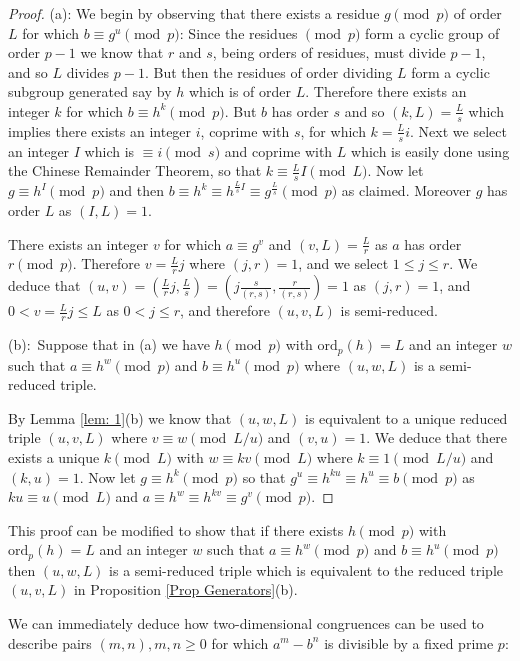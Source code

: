 \documentclass[12pt, a4paper,  reqno, english]{amsart}%
\numberwithin{equation}{section}
\theoremstyle{definition}
\renewcommand{\leq}{\leqslant}
\begin{document}
\begin{proof}  (a):  We begin by observing that there exists a residue $g \pmod p$ of order $L$ for which $b\equiv g^u\pmod p$:   Since the residues $\pmod p$ form a cyclic group of order $p-1$ we know that $r$ and $s$, being orders of residues, must divide $p-1$, and so $L$ divides $p-1$.
But then the residues of order dividing $L$ form a cyclic subgroup generated say by $h$ which is of order $L$. Therefore   there exists an integer $k$ for which $b\equiv h^k \pmod p$.  But $b$ has order $s$ and so 
$(k,L)=\frac{L}s$ which implies there exists an integer $i$, coprime with $s$, for which $k=\frac{L}s i$.  Next we select an integer $I$ which is $\equiv i \pmod s$ and coprime with $L$ which is easily done using the Chinese Remainder Theorem, so that
$k\equiv \frac{L}s I \pmod {L}$. Now let $g\equiv h^I \pmod p$ and then 
$b\equiv h^k \equiv h^{ \frac{L}s I}\equiv g^{\frac{L}s} \pmod p$ as claimed. Moreover $g$ has order $L$ as $(I,L)=1$.

There exists an integer $v$ for which $a\equiv g^v$ and $(v,L)=\frac{L}r$ as $a$ has order $r \pmod p$. Therefore $v=\frac{L}r j$ where $(j,r)=1$, and we select $1\leq j\leq r$.  We deduce that $(u,v)=(\frac{L}rj, \frac{L}s) =( j\frac s{(r,s)},\frac r{(r,s)}) =1  $ as $(j,r)=1$,
and   $0<v= \frac{L}r j\leq L$ as $0<j\leq r$, and therefore  $(u,v,L)$ is semi-reduced.

(b):\ Suppose that in (a) we have  $h\pmod p$ with $\text{ord}_p(h)=L$ and an integer $w$
such that $a\equiv h^w  \pmod p$ and $b\equiv h^{u} \pmod p$ where $(u,w,L)$ is a semi-reduced triple.

 By   Lemma \ref{lem: 1}(b) we know that $(u,w,L)$  is equivalent to a unique reduced triple $(u,v,L)$ where
$v\equiv w \pmod{L/u}$ and $(v,u)=1$.  We deduce that there exists a unique $k \pmod L$ with $w\equiv kv \pmod L$ where $k\equiv 1  \pmod{L/u}$ and $(k,u)=1$. Now let $g\equiv h^k \pmod p$ so that  $g^u\equiv h^{ku} \equiv h^u\equiv b \pmod p$ as 
$ku\equiv u \pmod L$ and
$a\equiv h^w\equiv h^{kv}\equiv g^v  \pmod p$.
\end{proof}

This proof can be modified  to show that if there exists  $h\pmod p$ with $\text{ord}_p(h)=L$ and an integer $w$
such that $a\equiv h^w  \pmod p$ and $b\equiv h^{u} \pmod p$ then $(u,w,L)$ is a semi-reduced triple which is equivalent to the reduced triple $(u,v,L)$ in Proposition \ref{Prop Generators}(b).

 We can immediately deduce how two-dimensional congruences can be used to describe pairs $(m,n), m,n\ge0$ for which $a^m-b^n$ is divisible by a fixed prime $p$:
\end{document}
